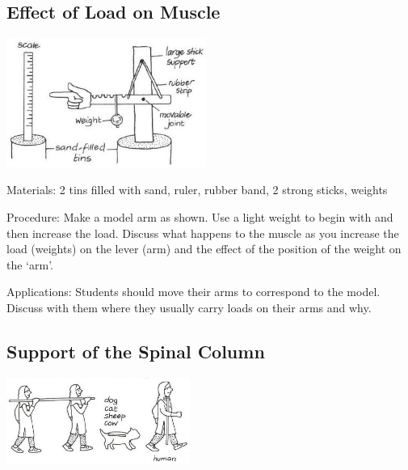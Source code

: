 \begin{multicols}{2}
\subsection{Effect of Load on Muscle}

\begin{center}
\includegraphics[width=0.49\textwidth]{./img/vso/load-muscle.jpg}
\end{center}

\begin{description*}
\item[Materials:]{2 tins filled with sand, ruler, rubber band, 2 strong sticks, weights}
\item[Procedure:]{Make a model arm as shown. Use a light weight to begin with and then
increase the load. Discuss what happens to the
muscle as you increase the load
(weights) on the lever (arm) and
the effect of the position of the
weight on the `arm'.
}
\item[Applications:]{Students should move their arms
to correspond to the model.
Discuss with them where they
usually carry loads on their arms
and why.}
\end{description*}

\subsection{Support of the Spinal Column}

\begin{center}
\includegraphics[width=0.45\textwidth]{./img/vso/spine.jpg}
\end{center}


\end{multicols}
